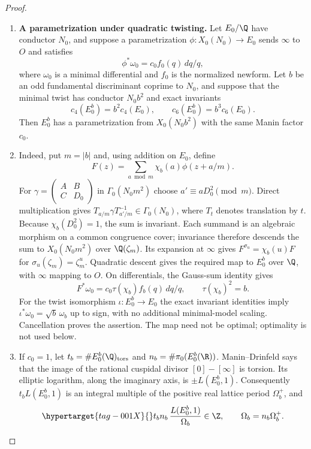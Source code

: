 \begin{proof}
\begin{enumerate}[label=\arabic*.,leftmargin=*]
\item \textbf{A parametrization under quadratic twisting.}
Let $E_0/\Q$ have conductor $N_0$, and suppose a parametrization
$\phi:X_0(N_0)\to E_0$ sends $\infty$ to $O$ and satisfies
\[
 \phi^*\omega_0=c_0f_0(q)\,dq/q,
\]
where $\omega_0$ is a minimal differential and $f_0$ is the normalized
newform. Let $b$ be an odd fundamental discriminant coprime to $N_0$,
and suppose that the minimal twist has conductor $N_0b^2$ and exact
invariants
\[
 c_4(E_0^b)=b^2c_4(E_0),\qquad
 c_6(E_0^b)=b^3c_6(E_0).
\]
Then $E_0^b$ has a parametrization from $X_0(N_0b^2)$ with the same
Manin factor $c_0$.

\item Indeed, put $m=|b|$ and, using addition on $E_0$, define
\[
 F(z)=\sum_{a\bmod m}\chi_b(a)\phi(z+a/m).
\]
For $\gamma=\left(\begin{smallmatrix}A&B\\C&D_0\end{smallmatrix}\right)$
in $\Gamma_0(N_0m^2)$ choose $a'\equiv aD_0^2\pmod m$.
Direct multiplication gives
$T_{a/m}\gamma T_{a'/m}^{-1}\in\Gamma_0(N_0)$, where $T_t$
denotes translation by $t$. Because $\chi_b(D_0^2)=1$, the sum is
invariant. Each summand is an algebraic morphism on a common
congruence cover; invariance therefore descends the sum to
$X_0(N_0m^2)$ over $\Q(\zeta_m)$. Its expansion at $\infty$
gives $F^{\sigma_u}=\chi_b(u)F$ for
$\sigma_u(\zeta_m)=\zeta_m^u$. Quadratic descent gives the required
map to $E_0^b$ over $\Q$, with $\infty$ mapping to $O$.
On differentials, the Gauss-sum identity gives
\[
 F^*\omega_0=c_0\tau(\chi_b)f_b(q)\,dq/q,
 \qquad \tau(\chi_b)^2=b.
\]
For the twist isomorphism $\iota:E_0^b\to E_0$ the exact invariant
identities imply
$\iota^*\omega_0=\sqrt b\,\omega_b$ up to sign, with no additional
minimal-model scaling. Cancellation proves the assertion. The map
need not be optimal; optimality is not used below.

\item If $c_0=1$, let $t_b=\#E_0^b(\Q)_{\rm tors}$ and
$n_b=\#\pi_0(E_0^b(\R))$. Manin--Drinfeld says that the image of
the rational cuspidal divisor $[0]-[\infty]$ is torsion. Its elliptic
logarithm, along the imaginary axis, is $\pm L(E_0^b,1)$.
Consequently $t_bL(E_0^b,1)$ is an integral multiple of the positive
real lattice period $\Omega_b^+$, and
\begin{equation}\hypertarget{tag-001X}{}\label{ari:eq:Cgz-central-integrality}
 t_bn_b\,\frac{L(E_0^b,1)}{\Omega_b}\in\Z,
 \qquad \Omega_b=n_b\Omega_b^+.
\end{equation}


\end{enumerate}
\end{proof}
